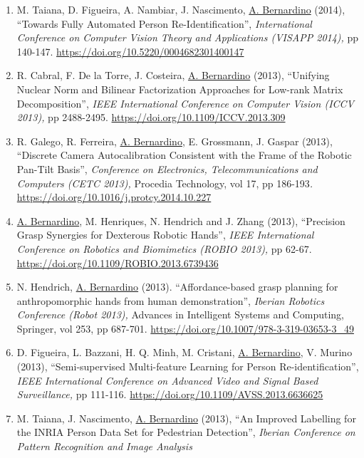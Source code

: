 \documentclass[
]{article}
\begin{document}
\begin{enumerate}
{  Bernardino}, J. Santos-Victor, P. Trahanias (2014), ``A Framework for
  3D Object Identification and Tracking'', \emph{International
  Conference on Computer Vision Theory and Applications (VISAPP 2014),}
  pp 672-677. \url{https://doi.org/10.5220/0004751506720677}
\item
  M. Taiana, D. Figueira, A. Nambiar, J. Nascimento, \ul{A. Bernardino}
  (2014), ``Towards Fully Automated Person Re-Identification'',
  \emph{International Conference on Computer Vision Theory and
  Applications (VISAPP 2014),} pp 140-147.
  \url{https://doi.org/10.5220/0004682301400147}
\item
  R. Cabral, F. De la Torre, J. Costeira, \ul{A. Bernardino} (2013),
  ``Unifying Nuclear Norm and Bilinear Factorization Approaches for
  Low-rank Matrix Decomposition'', \emph{IEEE International Conference
  on Computer Vision (ICCV 2013),} pp 2488-2495.
  \url{https://doi.org/10.1109/ICCV.2013.309}~
\item
  R. Galego, R. Ferreira, \ul{A. Bernardino}, E. Grossmann, J. Gaspar
  (2013), ``Discrete Camera Autocalibration Consistent with the Frame of
  the Robotic Pan-Tilt Basis'', \emph{Conference on Electronics,
  Telecommunications and Computers (CETC 2013),} Procedia Technology,
  vol 17, pp 186-193\emph{.}
  \url{https://doi.org/10.1016/j.protcy.2014.10.227}~
\item
  \ul{A. Bernardino}, M. Henriques, N. Hendrich and J. Zhang (2013),
  ``Precision Grasp Synergies for Dexterous Robotic Hands'', \emph{IEEE
  International Conference on Robotics and Biomimetics (ROBIO 2013),} pp
  62-67. \url{https://doi.org/10.1109/ROBIO.2013.6739436}
\item
  N. Hendrich, \ul{A. Bernardino} (2013). ``Affordance-based grasp
  planning for anthropomorphic hands from human demonstration'',
  \emph{Iberian Robotics Conference (Robot 2013),} Advances in
  Intelligent Systems and Computing, Springer, vol 253, pp 687-701.
  \url{https://doi.org/10.1007/978-3-319-03653-3_49}~
\item
  D. Figueira, L. Bazzani, H. Q. Minh, M. Cristani, \ul{A. Bernardino},
  V. Murino (2013), ``Semi-supervised Multi-feature Learning for Person
  Re-identification'', \emph{IEEE International Conference on Advanced
  Video and Signal Based Surveillance,} pp 111-116.
  \url{https://doi.org/10.1109/AVSS.2013.6636625}~
\item
  M. Taiana, J. Nascimento, \ul{A. Bernardino} (2013), ``An Improved
  Labelling for the INRIA Person Data Set for Pedestrian Detection'',
  \emph{Iberian Conference on Pattern Recognition and Image Analysis
}
\end{enumerate}
\end{document}
